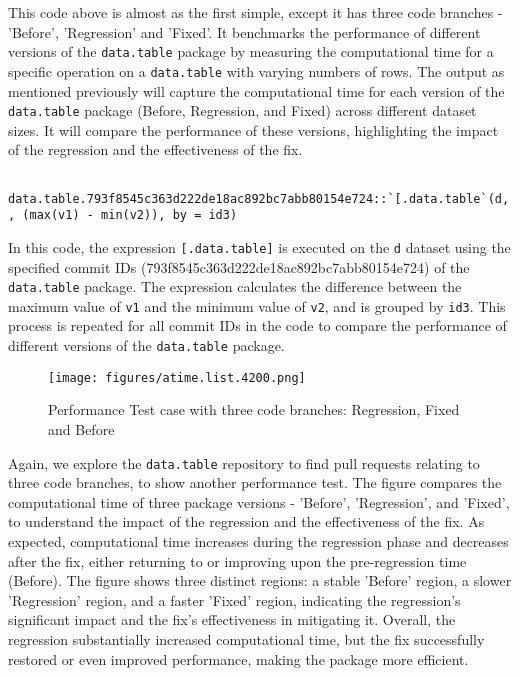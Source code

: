 \noindent This code above is almost as the first simple, except it has three code branches - 'Before', 'Regression' and 'Fixed'. It benchmarks the performance of different versions of the \texttt{data.table} package by measuring the computational time for a specific operation on a \texttt{data.table} with varying numbers of rows.
The output as mentioned previously will capture the computational time for each version of the \texttt{data.table} package (Before, Regression, and Fixed) across different dataset sizes. It will compare the performance of these versions, highlighting the impact of the regression and the effectiveness of the fix. \\


    \begin{verbatim}
    data.table.793f8545c363d222de18ac892bc7abb80154e724::`[.data.table`(d, , (max(v1) - min(v2)), by = id3)  
    \end{verbatim}
    
\vspace{0.1in}
\noindent In this code, the expression \texttt{[.data.table]} is executed on the \texttt{d} dataset using the specified commit IDs (793f8545c363d222de18ac892bc7abb80154e724) of the \texttt{data.table} package. The expression calculates the difference between the maximum value of \texttt{v1} and the minimum value of \texttt{v2}, and is grouped by \texttt{id3}. This process is repeated for all commit IDs in the code to compare the performance of different versions of the \texttt{data.table} package.\\

\begin{figure}[H]
    \centering
    \texttt{[image: figures/atime.list.4200.png]}
    \caption{Performance Test case with three code branches: Regression, Fixed and Before}
    \label{fig:label4}
\end{figure}

\noindent Again, we explore the \texttt{data.table} repository to find pull requests relating to three code branches, to show another performance test. The figure compares the computational time of three package versions - 'Before', 'Regression', and 'Fixed', to understand the impact of the regression and the effectiveness of the fix. As expected, computational time increases during the regression phase and decreases after the fix, either returning to or improving upon the pre-regression time (Before). The figure shows three distinct regions: a stable 'Before' region, a slower 'Regression' region, and a faster 'Fixed' region, indicating the regression's significant impact and the fix's effectiveness in mitigating it. Overall, the regression substantially increased computational time, but the fix successfully restored or even improved performance, making the package more efficient.\\


